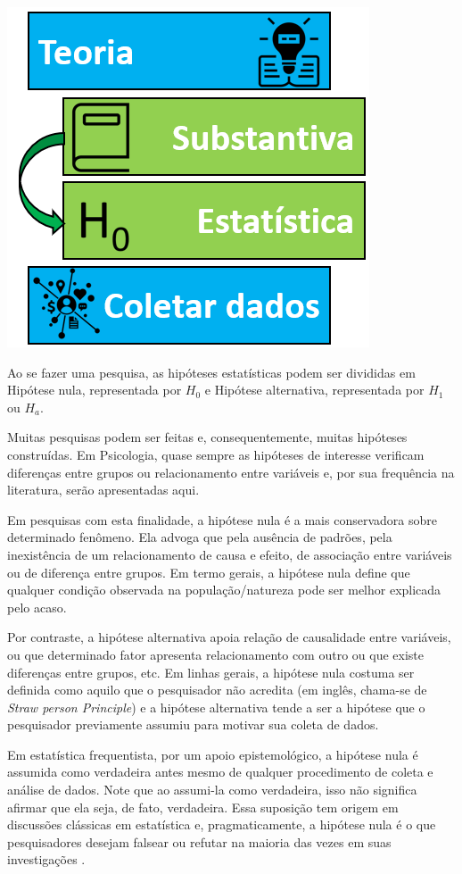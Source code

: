 \documentclass[
]{book}
\begin{document}
\includegraphics{./img/cap_inferencia_tipos_hipoteses.png}

Ao se fazer uma pesquisa, as hipóteses estatísticas podem ser divididas em Hipótese nula, representada por \(H_0\) e Hipótese alternativa, representada por \(H_1\) ou \(H_a\).

Muitas pesquisas podem ser feitas e, consequentemente, muitas hipóteses construídas. Em Psicologia, quase sempre as hipóteses de interesse verificam diferenças entre grupos ou relacionamento entre variáveis e, por sua frequência na literatura, serão apresentadas aqui.

Em pesquisas com esta finalidade, a hipótese nula é a mais conservadora sobre determinado fenômeno. Ela advoga que pela ausência de padrões, pela inexistência de um relacionamento de causa e efeito, de associação entre variáveis ou de diferença entre grupos. Em termo gerais, a hipótese nula define que qualquer condição observada na população/natureza pode ser melhor explicada pelo acaso.

Por contraste, a hipótese alternativa apoia relação de causalidade entre variáveis, ou que determinado fator apresenta relacionamento com outro ou que existe diferenças entre grupos, etc. Em linhas gerais, a hipótese nula costuma ser definida como aquilo que o pesquisador não acredita (em inglês, chama-se de \emph{Straw person Principle}) e a hipótese alternativa tende a ser a hipótese que o pesquisador previamente assumiu para motivar sua coleta de dados.

Em estatística frequentista, por um apoio epistemológico, a hipótese nula é assumida como verdadeira antes mesmo de qualquer procedimento de coleta e análise de dados. Note que ao assumi-la como verdadeira, isso não significa afirmar que ela seja, de fato, verdadeira. Essa suposição tem origem em discussões clássicas em estatística e, pragmaticamente, a hipótese nula é o que pesquisadores desejam falsear ou refutar na maioria das vezes em suas investigações \citep{Lecoutre2014}.
\end{document}
